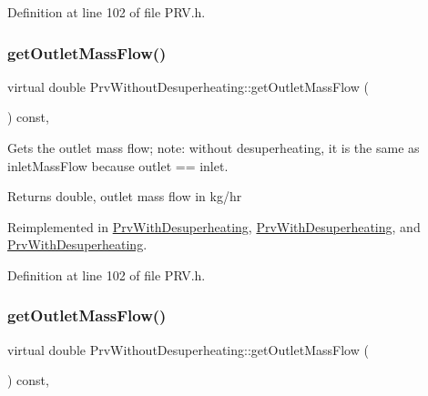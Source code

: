 Definition at line 102 of file P\+R\+V.\+h.

\mbox{\label{class_prv_without_desuperheating_aefe4227f2c01209ba4ce79f6b5825d73}} 
\subsubsection{\texorpdfstring{get\+Outlet\+Mass\+Flow()}{getOutletMassFlow()}\hspace{0.1cm}{\footnotesize\ttfamily [2/3]}}
{\footnotesize\ttfamily virtual double Prv\+Without\+Desuperheating\+::get\+Outlet\+Mass\+Flow (\begin{DoxyParamCaption}{ }\end{DoxyParamCaption}) const\hspace{0.3cm}{\ttfamily [inline]}, {\ttfamily [virtual]}}

Gets the outlet mass flow; note\+: without desuperheating, it is the same as inlet\+Mass\+Flow because outlet == inlet. \begin{DoxyReturn}{Returns}
double, outlet mass flow in kg/hr 
\end{DoxyReturn}


Reimplemented in \hyperlink{class_prv_with_desuperheating_a76c03ff2f54c85cd0c80543f23549635}{Prv\+With\+Desuperheating}, \hyperlink{class_prv_with_desuperheating_a76c03ff2f54c85cd0c80543f23549635}{Prv\+With\+Desuperheating}, and \hyperlink{class_prv_with_desuperheating_a76c03ff2f54c85cd0c80543f23549635}{Prv\+With\+Desuperheating}.



Definition at line 102 of file P\+R\+V.\+h.

\mbox{\label{class_prv_without_desuperheating_aefe4227f2c01209ba4ce79f6b5825d73}} 
\subsubsection{\texorpdfstring{get\+Outlet\+Mass\+Flow()}{getOutletMassFlow()}\hspace{0.1cm}{\footnotesize\ttfamily [3/3]}}
{\footnotesize\ttfamily virtual double Prv\+Without\+Desuperheating\+::get\+Outlet\+Mass\+Flow (\begin{DoxyParamCaption}{ }\end{DoxyParamCaption}) const\hspace{0.3cm}{\ttfamily [inline]}, {\ttfamily [virtual]}}

